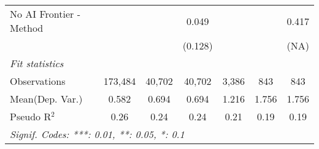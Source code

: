 \begin{tabular}{lcccccc}
   No AI Frontier - Method &               &               & 0.049         &             &         & 0.417\\   
                           &               &               & (0.128)       &             &         & (NA)\\   
   \midrule
   \emph{Fit statistics}\\
   Observations            & 173,484       & 40,702        & 40,702        & 3,386       & 843     & 843\\  
Mean(Dep. Var.) & 0.582 & 0.694 & 0.694 & 1.216 & 1.756 & 1.756 \\
   Pseudo R$^2$            & 0.26          & 0.24          & 0.24          & 0.21        & 0.19    & 0.19\\  
   \midrule \midrule
   \multicolumn{7}{l}{\emph{Signif. Codes: ***: 0.01, **: 0.05, *: 0.1}}\\
\end{tabular}
\par\endgroup
